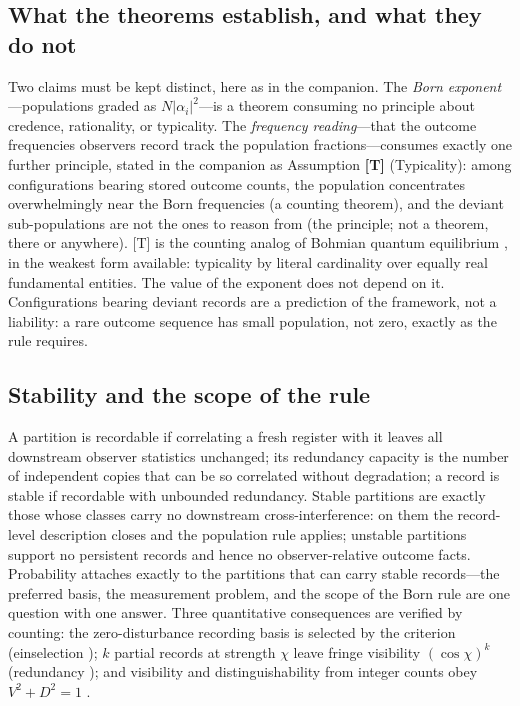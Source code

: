 \documentclass[11pt]{article}
\theoremstyle{definition}
\theoremstyle{remark}
\begin{document}
\subsection{What the theorems establish, and what they do not}\label{sec:twotier}
Two claims must be kept distinct, here as in the companion. The \emph{Born exponent}---populations graded as $N|\alpha_i|^2$---is a theorem consuming no principle about credence, rationality, or typicality. The \emph{frequency reading}---that the outcome frequencies observers record track the population fractions---consumes exactly one further principle, stated in the companion as Assumption \textbf{[T]} (Typicality): among configurations bearing stored outcome counts, the population concentrates overwhelmingly near the Born frequencies (a counting theorem), and the deviant sub-populations are not the ones to reason from (the principle; not a theorem, there or anywhere). [T] is the counting analog of Bohmian quantum equilibrium \cite{Durr1992}, in the weakest form available: typicality by literal cardinality over equally real fundamental entities. The value of the exponent does not depend on it. Configurations bearing deviant records are a prediction of the framework, not a liability: a rare outcome sequence has small population, not zero, exactly as the rule requires.

\subsection{Stability and the scope of the rule}\label{sec:stability}
A partition is recordable if correlating a fresh register with it leaves all downstream observer statistics unchanged; its redundancy capacity is the number of independent copies that can be so correlated without degradation; a record is stable if recordable with unbounded redundancy. Stable partitions are exactly those whose classes carry no downstream cross-interference: on them the record-level description closes and the population rule applies; unstable partitions support no persistent records and hence no observer-relative outcome facts. Probability attaches exactly to the partitions that can carry stable records---the preferred basis, the measurement problem, and the scope of the Born rule are one question with one answer. Three quantitative consequences are verified by counting: the zero-disturbance recording basis is selected by the criterion (einselection \cite{Zurek2003}); $k$ partial records at strength $\chi$ leave fringe visibility $(\cos\chi)^k$ (redundancy \cite{Zurek2009}); and visibility and distinguishability from integer counts obey $V^2 + D^2 = 1$ \cite{WoottersZurek1979,Englert1996}.
\end{document}
